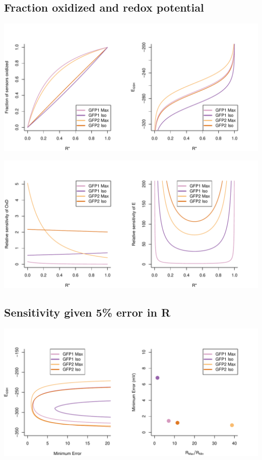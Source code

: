 \documentclass[]{article}
\begin{document}
\subsection{Fraction oxidized and redox
potential}\label{fraction-oxidized-and-redox-potential}

\begin{center}\includegraphics{Comparison_roGFP1_roGFP2_files/figure-latex/OxD and E-1} \end{center}

\begin{center}\includegraphics{Comparison_roGFP1_roGFP2_files/figure-latex/Sensitivity of E and OxD-1} \end{center}

\subsection{Sensitivity given 5\% error in
R}\label{sensitivity-given-5-error-in-r}

\begin{center}\includegraphics{Comparison_roGFP1_roGFP2_files/figure-latex/unnamed-chunk-1-1} \end{center}
\end{document}
